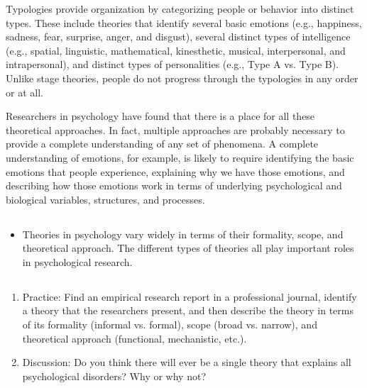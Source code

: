 Typologies provide organization by categorizing people or behavior into distinct types. These include theories that identify several basic emotions (e.g., happiness, sadness, fear, surprise, anger, and disgust), several distinct types of intelligence (e.g., spatial, linguistic, mathematical, kinesthetic, musical, interpersonal, and intrapersonal), and distinct types of personalities (e.g., Type A vs. Type B). Unlike stage theories, people do not progress through the typologies in any order or at all.

Researchers in psychology have found that there is a place for all these theoretical approaches. In fact, multiple approaches are probably necessary to provide a complete understanding of any set of phenomena. A complete understanding of emotions, for example, is likely to require identifying the basic emotions that people experience, explaining why we have those emotions, and describing how those emotions work in terms of underlying psychological and biological variables, structures, and processes.


\subsection{}

\begin{fullwidth}
\begin{itemize}
\item  Theories in psychology vary widely in terms of their formality, scope, and theoretical approach. The different types of theories all play important roles in psychological research.
\end{itemize}
\end{fullwidth}


\subsection{}
\begin{fullwidth}
\begin{enumerate}
\item Practice: Find an empirical research report in a professional journal, identify a theory that the researchers present, and then describe the theory in terms of its formality (informal vs. formal), scope (broad vs. narrow), and theoretical approach (functional, mechanistic, etc.).
\item Discussion: Do you think there will ever be a single theory that explains all psychological disorders? Why or why not?
\end{enumerate}
\end{fullwidth}  

